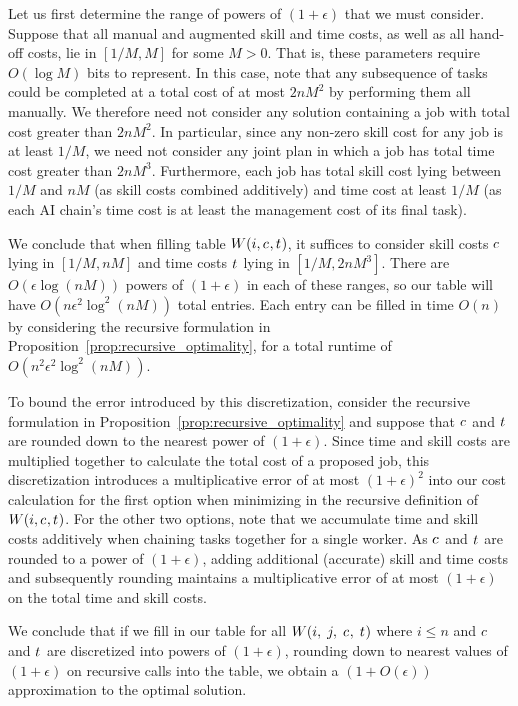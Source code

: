 \documentclass{article}
\theoremstyle{plain}
\theoremstyle{plain}
\begin{document}
Let us first determine the range of powers of $(1+\epsilon)$ that we must consider. 
Suppose that all manual and augmented skill and time costs, as well as all hand-off costs, lie in $[1/M, M]$ for some $M > 0$.  That is, these parameters require $O(\log M)$ bits to represent.  In this case, note that any subsequence of tasks could be completed at a total cost of at most $2nM^2$ by performing them all manually.  We therefore need not consider any solution containing a job with total cost greater than $2nM^2$.  In particular, since any non-zero skill cost for any job is at least $1/M$, we need not consider any joint plan in which a job has total time cost greater than $2nM^3$.  Furthermore, each job has total skill cost lying between $1/M$ and $nM$ (as skill costs combined additively) and time cost at least $1/M$ (as each AI chain's time cost is at least the management cost of its final task).

We conclude that when filling table $W(i, c_{}, t_{})$, it suffices to consider skill costs $c_{}$ lying in $[1/M, nM]$ and time costs $t_{}$ lying in $[1/M, 2nM^3]$.  There are $O(\epsilon \log(nM))$ powers of $(1+\epsilon)$ in each of these ranges, so our table will have $O(n \epsilon^2 \log^2(nM))$ total entries.  Each entry can be filled in time $O(n)$ by considering the recursive formulation in Proposition~\ref{prop:recursive_optimality}, for a total runtime of $O(n^2 \epsilon^2 \log^2(nM))$.

To bound the error introduced by this discretization, consider the recursive formulation in Proposition~\ref{prop:recursive_optimality} and suppose that $c_{}$ and $t_{}$ are rounded down to the nearest power of $(1+\epsilon)$.  Since time and skill costs are multiplied together to calculate the total cost of a proposed job, this discretization introduces a multiplicative error of at most $(1+\epsilon)^2$ into our cost calculation for the first option when minimizing in the recursive definition of $W(i, c_{}, t_{})$. For the other two options, note that we accumulate time and skill costs additively when chaining tasks together for a single worker.  As $c_{}$ and $t_{}$ are rounded to a power of $(1+\epsilon)$, adding additional (accurate) skill and time costs and subsequently rounding maintains a multiplicative error of at most $(1+\epsilon)$ on the total time and skill costs.  

We conclude that if we fill in our table for all $W(i,\; j,\; c_{},\; t_{})$ where $i \leq n$ and $c_{}$ and $t_{}$ are discretized into powers of $(1+\epsilon)$, rounding down to nearest values of $(1+\epsilon)$ on recursive calls into the table, we obtain a $(1 + O(\epsilon))$ approximation to the optimal solution.
\end{document}
